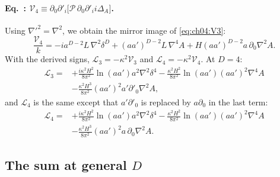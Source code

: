 \paragraph{Eq.~: $\mathcal V_4\equiv\partial_0\partial'_i\big[\mathcal P\,\partial_0\partial'_i i\Delta_A\big]$.}
Using $\nabla'^2=\nabla^2$, we obtain the mirror image of \eqref{eq:ch04:V3}:
\begin{equation}
\frac{\mathcal V_4}{k}=-ia^{D-2}L\,\nabla^2\delta^D+(aa')^{D-2}L\,\nabla^4A+H(aa')^{D-2}a\,\partial_0\nabla^2A .
\label{eq:ch04:V4}
\end{equation}
With the derived signs, $\mathcal L_3=-\kappa^2\mathcal V_3$ and $\mathcal L_4=-\kappa^2\mathcal V_4$. At $D=4$:
\begin{equation*}
\begin{aligned}
\mathcal L_3={}&+\frac{i\kappa^2H^2}{8\pi^2}\ln(aa')a^2\nabla^2\delta^4-\frac{\kappa^2H^2}{8\pi^2}\ln(aa')(aa')^2\nabla^4A\\
&-\frac{\kappa^2H^3}{8\pi^2}(aa')^2a'\partial'_0\nabla^2A,
\end{aligned}
\tag{I.65$'$}\label{eq:ch04:65}
\end{equation*}
and $\mathcal L_4$ is the same except that $a'\partial'_0$ is replaced by $a\partial_0$ in the last term:
\begin{equation*}
\begin{aligned}
\mathcal L_4={}&+\frac{i\kappa^2H^2}{8\pi^2}\ln(aa')a^2\nabla^2\delta^4-\frac{\kappa^2H^2}{8\pi^2}\ln(aa')(aa')^2\nabla^4A\\
&-\frac{\kappa^2H^3}{8\pi^2}(aa')^2a\,\partial_0\nabla^2A .
\end{aligned}
\tag{I.66$'$}\label{eq:ch04:66}
\end{equation*}

\subsection{The sum at general \texorpdfstring{$D$}{D} \texorpdfstring{\tD}{}}

